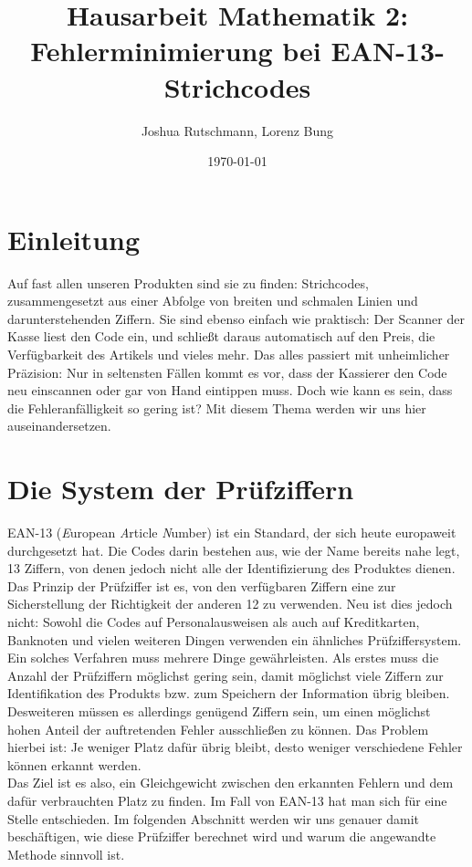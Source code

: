 \documentclass[a4paper,12pt]{article}
\title{Hausarbeit Mathematik 2: Fehlerminimierung bei EAN-13-Strichcodes}
\author{Joshua Rutschmann, Lorenz Bung}
\date{\today}
\begin{document}
\maketitle
\section{Einleitung}
Auf fast allen unseren Produkten sind sie zu finden: Strichcodes, zusammengesetzt aus einer Abfolge von breiten und schmalen Linien und darunterstehenden Ziffern. Sie sind ebenso einfach wie praktisch: Der Scanner der Kasse liest den Code ein, und schließt daraus automatisch auf den Preis, die Verfügbarkeit des Artikels und vieles mehr. Das alles passiert mit unheimlicher Präzision: Nur in seltensten Fällen kommt es vor, dass der Kassierer den Code neu einscannen oder gar von Hand eintippen muss. Doch wie kann es sein, dass die Fehleranfälligkeit so gering ist? Mit diesem Thema werden wir uns hier auseinandersetzen.

\section{Die System der Prüfziffern}
EAN-13 (\textit{E}uropean \textit{A}rticle \textit{N}umber) ist ein Standard, der sich heute europaweit durchgesetzt hat. Die Codes darin bestehen aus, wie der Name bereits nahe legt, 13 Ziffern, von denen jedoch nicht alle der Identifizierung des Produktes dienen. Das Prinzip der Prüfziffer ist es, von den verfügbaren Ziffern eine zur Sicherstellung der Richtigkeit der anderen 12 zu verwenden. Neu ist dies jedoch nicht: Sowohl die Codes auf  Personalausweisen als auch auf Kreditkarten, Banknoten und vielen weiteren Dingen verwenden ein ähnliches Prüfziffersystem.\\
Ein solches Verfahren muss mehrere Dinge gewährleisten. Als erstes muss die Anzahl der Prüfziffern möglichst gering sein, damit möglichst viele Ziffern zur Identifikation des Produkts bzw. zum Speichern der Information übrig bleiben. Desweiteren müssen es allerdings genügend Ziffern sein, um einen möglichst hohen Anteil der auftretenden Fehler ausschließen zu können. Das Problem hierbei ist: Je weniger Platz dafür übrig bleibt, desto weniger verschiedene Fehler können erkannt werden.\\
Das Ziel ist es also, ein Gleichgewicht zwischen den erkannten Fehlern und dem dafür verbrauchten Platz zu finden. Im Fall von EAN-13 hat man sich für eine Stelle entschieden. Im folgenden Abschnitt werden wir uns genauer damit beschäftigen, wie diese Prüfziffer berechnet wird und warum die angewandte Methode sinnvoll ist.
\end{document}
